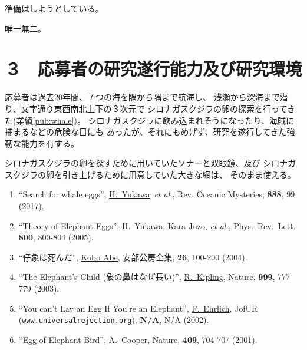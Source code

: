 \documentclass[11pt,a4j,dvipdfmx]{jarticle} 					%
\newcommand{\研究課題名}{象の卵}
\newcommand{\研究機関名}{逢坂大学}
\newcommand{\研究代表者氏名}{湯川秀樹}
\newcommand{\me}{\underline{\underline{H.~Yukawa}}}
\newcommand{\研究期間の最終元号年度}{34}  %
\begin{document}
	準備はしようとしている。

	唯一無二。




\section{３　応募者の研究遂行能力及び研究環境}

	応募者は過去20年間、７つの海を隅から隅まで航海し、
	浅瀬から深海まで潜り、文字通り東西南北上下の３次元で
	シロナガスクジラの卵の探索を行ってきた(業績\ref{pub:whale})。
	シロナガスクジラに飲み込まれそうになったり、海賊に捕まるなどの危険な目にも
	あったが、それにもめげず、研究を遂行してきた強靭な能力を有する。

	シロナガスクジラの卵を探すために用いていたソナーと双眼鏡、及び
	シロナガスクジラの卵を引き上げるために用意していた大きな網は、
	そのまま使える。
	\begin{enumerate}
		\item \label{pub:whale} ``Search for whale eggs'', 
				\me\ {\it et al.},
				Rev. Oceanic Mysteries, {\bf 888}, 99 (2017).
				
		\item \label{pub:theoegg} ``Theory of Elephant Eggs'', 
				\me, \underline{Kara Juzo}, {\it et al.},
				Phys.\ Rev.\ Lett. {\bf 800}, 800-804 (2005). 
				
		\item ``仔象は死んだ'', 
				\underline{Kobo Abe}, 
				安部公房全集, {\bf 26}, 100-200 (2004).
		\item ``The Elephant's Child (象の鼻はなぜ長い)'', 
				\underline{R.~Kipling},
				Nature, {\bf 999}, 777-779 (2003).
		\item ``You can't Lay an Egg If You're an Elephant'', 
				\underline{F.~Ehrlich},
				JofUR\\
				 ({\tt www.universalrejection.org}), {\bf N/A}, N/A (2002).
		\item ``Egg of Elephant-Bird'', 
				\underline{A.~Cooper},
				Nature, {\bf 409}, 704-707 (2001).	
	\end{enumerate}
\end{document}
